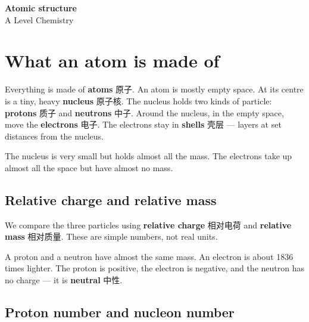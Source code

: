 \documentclass[11pt]{article}
\begin{document}
\begin{center}
  {\LARGE\bfseries Atomic structure}\\[0.35em]
  {\large A Level Chemistry}
\end{center}
\vspace{0.6em}

\section*{What an atom is made of}

Everything is made of \textbf{atoms} 原子. An atom is mostly empty space. At its centre is a tiny, heavy \textbf{nucleus} 原子核. The nucleus holds two kinds of particle: \textbf{protons} 质子 and \textbf{neutrons} 中子. Around the nucleus, in the empty space, move the \textbf{electrons} 电子. The electrons stay in \textbf{shells} 壳层 — layers at set distances from the nucleus.

The nucleus is very small but holds almost all the mass. The electrons take up almost all the space but have almost no mass.

\subsection*{Relative charge and relative mass}

We compare the three particles using \textbf{relative charge} 相对电荷 and \textbf{relative mass} 相对质量. These are simple numbers, not real units.

\begin{center}
\end{center}

A proton and a neutron have almost the same mass. An electron is about 1836 times lighter. The proton is positive, the electron is negative, and the neutron has no charge — it is \textbf{neutral} 中性.

\subsection*{Proton number and nucleon number}
\end{document}
